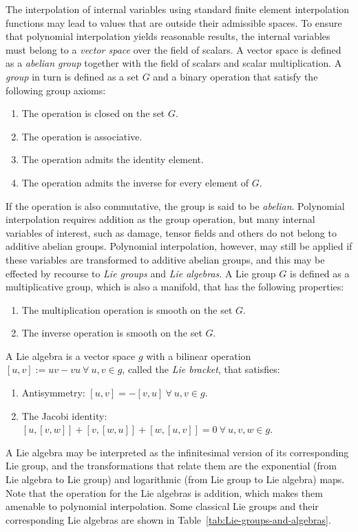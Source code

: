 \documentclass[12pt]{article}
\begin{document}
The interpolation of internal variables using standard finite element
interpolation functions may lead to values that are outside their admissible
spaces. To ensure that polynomial interpolation yields reasonable results, the
internal variables must belong to a \emph{vector space} over the field of
scalars. A vector space is defined as a \emph{abelian group} together with the
field of scalars and scalar multiplication. A \emph{group} in turn is defined as
a set $G$ and a binary operation that satisfy the following group axioms:
\begin{enumerate}
  \item The operation is closed on the set $G$.
  \item The operation is associative.
  \item The operation admits the identity element.
  \item The operation admits the inverse for every element of $G$.
\end{enumerate}
If the operation is also commutative, the group is said to be
\emph{abelian}. Polynomial interpolation requires addition as the
group operation, but many internal variables of interest, such as
damage, tensor fields and others do not belong to additive abelian groups.
Polynomial interpolation, however, may still be applied if these variables are
transformed to additive abelian groups, and this may be effected by recourse to
\emph{Lie
  groups} and \emph{Lie algebras}. A Lie group $G$ is defined as a
multiplicative group, which is also a manifold, that has the following
properties:
\begin{enumerate}
  \item The multiplication operation is smooth on the set $G$.
  \item The inverse operation is smooth on the set $G$.
\end{enumerate}
A Lie algebra is a vector space $g$ with a bilinear operation $[u,v]
:= uv - vu \: \forall \: u,v \in g$, called the \emph{Lie bracket}, that
satisfies:
\begin{enumerate}
  \item Antisymmetry: $[u,v] = - [v,u] \: \forall \: u,v \in g$.
  \item The Jacobi identity: $[u,[v,w]] + [v,[w,u]] + [w,[u,v]] = 0 \:
    \forall \: u,v,w \in g$.
\end{enumerate}
A Lie algebra may be interpreted as the infinitesimal version of its
corresponding Lie group, and the transformations that relate them are
the exponential (from Lie algebra to Lie group) and logarithmic (from
Lie group to Lie algebra) maps. Note that the operation for the Lie
algebras is addition, which makes them amenable to polynomial
interpolation. Some classical Lie groups and their corresponding Lie
algebras are shown in Table~\ref{tab:Lie-groups-and-algebras}.
\end{document}
